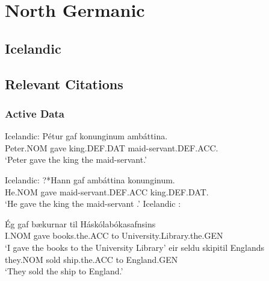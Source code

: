\section{North Germanic}
\subsection{Icelandic}
\subsection{Relevant Citations}
\cite{}
\subsubsection{Active Data}
\begin{exe}
	 Icelandic:
		\gll P\'{e}tur gaf konunginum amb\'{a}ttina.\\
		Peter.NOM gave king.DEF.DAT maid-servant.DEF.ACC.\\
		\trans `Peter gave the king the maid-servant.'

	 Icelandic:
		\gll ?*Hann gaf amb\'attina konunginum.\\
		He.NOM gave maid-servant.DEF.ACC king.DEF.DAT. \\
		\trans `He gave the king the maid-servant \citep[ex 14b]{Dehe.2004}.'
	 Icelandic \citep{Thrainsson.2007}:
		\begin{xlist}
		\ex \gll \'{E}g gaf b\ae kurnar til H\'ask\'olab\'okasafnsins\\
		I.NOM gave books.the.ACC to University.Library.the.GEN\\
		\trans `I gave the books to the University Library'
		\ex \gll \th eir seldu skipi\dh til Englands\\
		they.NOM sold ship.the.ACC to England.GEN\\
		\trans `They sold the ship to England.'
		\end{xlist}

\end{exe}
